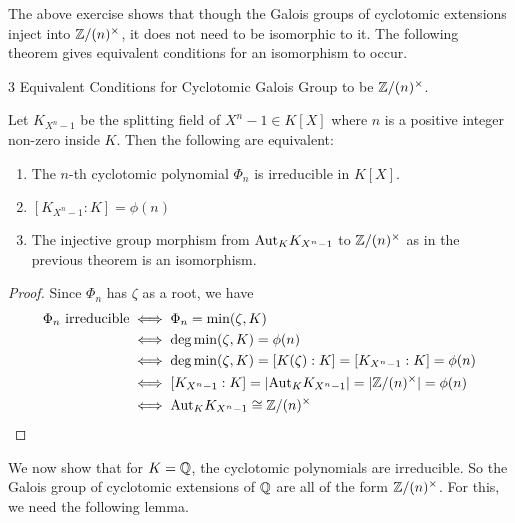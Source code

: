 \documentclass[../book.tex]{subfiles}
\begin{document}
\begin{rmk}
    
    The above exercise shows that
    though the Galois groups of cyclotomic extensions inject into $\mathbb{Z}/(n)^\times$,
    it does not need to be isomorphic to it. 
    The following theorem gives equivalent conditions for an isomorphism to occur.
    
\end{rmk}
\begin{thm} 3 Equivalent Conditions for Cyclotomic Galois Group to be $\mathbb{Z}/(n)^\times$.
    
    Let $K_{X^n - 1}$ be the splitting field of $X^n - 1 \in K[X]$
    where $n$ is a positive integer non-zero inside $K$. 
    Then the following are equivalent: \begin{enumerate}
        \item The $n$-th cyclotomic polynomial $\Phi_n$ is irreducible in $K[X]$.
        \item $[K_{X^n - 1} : K] = \phi(n)$
        \item The injective group morphism 
        from $\mathrm{Aut}_{K}K_{X^n - 1}$ to $\mathbb{Z}/(n)^\times$
        as in the previous theorem is an isomorphism.
    \end{enumerate}
    
\end{thm}
\begin{proof}
    
    Since $\Phi_n$ has $\zeta$ as a root, we have \begin{align*}
        \Phi_n \text{ irreducible} &\iff \Phi_n = \min(\zeta,K) \\
        &\iff \deg\min(\zeta,K) = \phi(n) \\
        &\iff \deg\min(\zeta,K) = [K(\zeta) : K] = [K_{X^n - 1} : K] = \phi(n) \\
        &\iff [K_{X^n - 1} : K] = |\mathrm{Aut}_{K}K_{X^n - 1}| = |\mathbb{Z}/(n)^\times| = \phi(n) \\
        &\iff \mathrm{Aut}_{K}K_{X^n - 1} \cong \mathbb{Z}/(n)^\times
    \end{align*}
    
\end{proof}

We now show that for $K = \mathbb{Q}$, the cyclotomic polynomials are irreducible.
So the Galois group of cyclotomic extensions of $\mathbb{Q}$ 
are all of the form $\mathbb{Z}/(n)^\times$.
For this, we need the following lemma.
\end{document}
